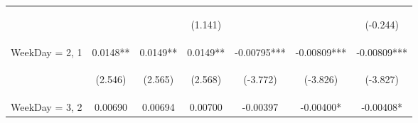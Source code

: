 \documentclass[]{article}
\begin{document}
\begin{center}
\begin{tabular}{lcccccc}
        \vspace{4pt}     & \begin{footnotesize}\end{footnotesize}         & \begin{footnotesize}\end{footnotesize}         & \begin{footnotesize}(1.141)\end{footnotesize}  & \begin{footnotesize}\end{footnotesize}         & \begin{footnotesize}\end{footnotesize}         & \begin{footnotesize}(-0.244)\end{footnotesize} \\
        WeekDay = 2, 1   & 0.0148**                                       & 0.0149**                                       & 0.0149**                                       & -0.00795***                                    & -0.00809***                                    & -0.00809***                                    \\
        \vspace{4pt}     & \begin{footnotesize}(2.546)\end{footnotesize}  & \begin{footnotesize}(2.565)\end{footnotesize}  & \begin{footnotesize}(2.568)\end{footnotesize}  & \begin{footnotesize}(-3.772)\end{footnotesize} & \begin{footnotesize}(-3.826)\end{footnotesize} & \begin{footnotesize}(-3.827)\end{footnotesize} \\
        WeekDay = 3, 2   & 0.00690                                        & 0.00694                                        & 0.00700                                        & -0.00397                                       & -0.00400*                                      & -0.00408*                                      \\

\end{tabular}
\end{center}
\end{document}
